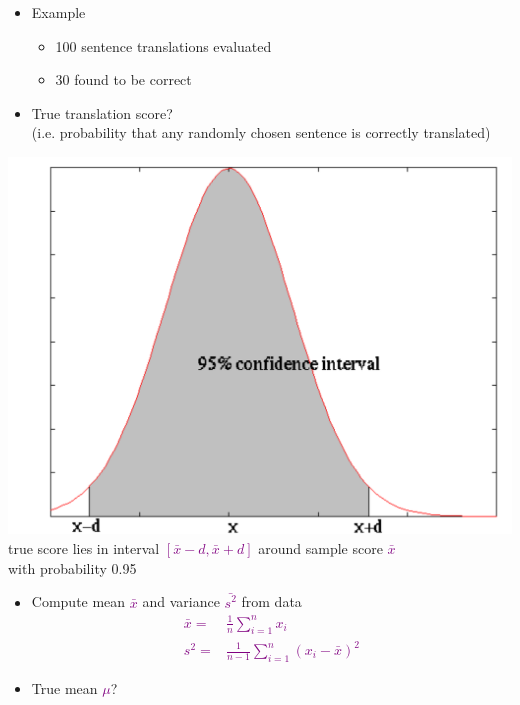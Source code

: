 \documentclass[landscape]{slides}
\newcommand{\maths}[1]{\textcolor{purple}{#1}}
\begin{document}

\vspace{30mm}
\begin{itemize} \itemsep 10mm
\item Example
\begin{itemize}
\item 100 sentence translations evaluated
\item 30 found to be correct
\end{itemize}
\item True translation score?\\[5mm]
(i.e. probability that any randomly chosen sentence is correctly translated)
\end{itemize}


\begin{center}
\includegraphics[scale=0.65]{distribution.pdf}\\[5mm]
true score lies in interval \maths{$[\bar{x}-d,\bar{x}+d]$} around sample score \maths{$\bar{x}$}\\
with probability 0.95
\end{center}


\vspace{10mm}
\begin{itemize}
\item Compute mean \maths{$\bar{x}$} and variance \maths{$\bar{s^2}$} from data
\maths{\begin{equation*}
\begin{split}
\bar{x} =& \frac{1}{n} \sum_{i=1}^n x_i \\
s^2 =& \frac{1}{n-1} \sum_{i=1}^n (x_i - \bar{x})^2
\end{split}
\end{equation*}}
\item True mean \maths{$\mu$}?
\end{itemize}
\end{document}

